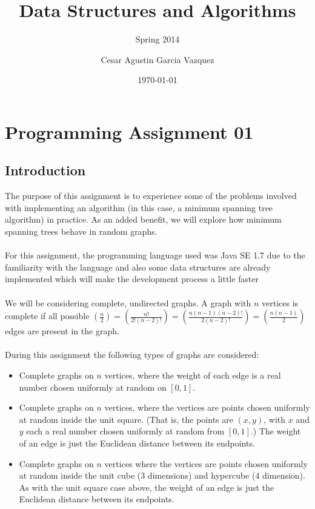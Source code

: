 \documentclass[tikz, 12pt]{scrartcl}
\title{Data Structures and Algorithms}
\subtitle{Spring 2014}
\author{Cesar Agustin Garcia Vazquez}
\date{\today}                                           %
\begin{document}
\maketitle
\section{Programming Assignment 01}

\subsection{Introduction}
The purpose of this assignment is to experience some of the problems involved with implementing an algorithm (in this case, a minimum spanning tree algorithm) in practice. As an added benefit, we will explore how minimum spanning trees behave in random graphs.\\
\\
For this assignment, the programming language used was Java SE 1.7 due to the familiarity with the language and also some data structures are already implemented which will make the development process a little faster\\
\\
We will be considering complete, undirected graphs. A graph with $n$ vertices is complete if all possible $\left( \frac{n}{2} \right) = \left( \frac{n!}{2!(n-2)!} \right) = \left( \frac{n(n-1)(n-2)!}{2(n-2)!} \right) = \left( \frac{n(n-1)}{2} \right) $ edges are present in the graph. \\
\\
 During this assignment the following types of graphs are considered:
 \begin{itemize}
 	\item Complete graphs on $n$ vertices, where the weight of each edge is a real number chosen uniformly at random on $[0, 1]$.
	\item Complete graphs on $n$ vertices, where the vertices are points chosen uniformly at random inside the unit square. (That is, the points are $(x, y)$, with $x$ and $y$ each a real number chosen uniformly at random from $[0, 1]$.) The weight of an edge is just the Euclidean distance between its endpoints.
	\item Complete graphs on $n$ vertices where the vertices are points chosen uniformly at random inside the unit cube (3 dimensions) and hypercube (4 dimension). As with the unit square case above, the weight of an edge is just the Euclidean distance between its endpoints.
 \end{itemize}
 
\end{document}
